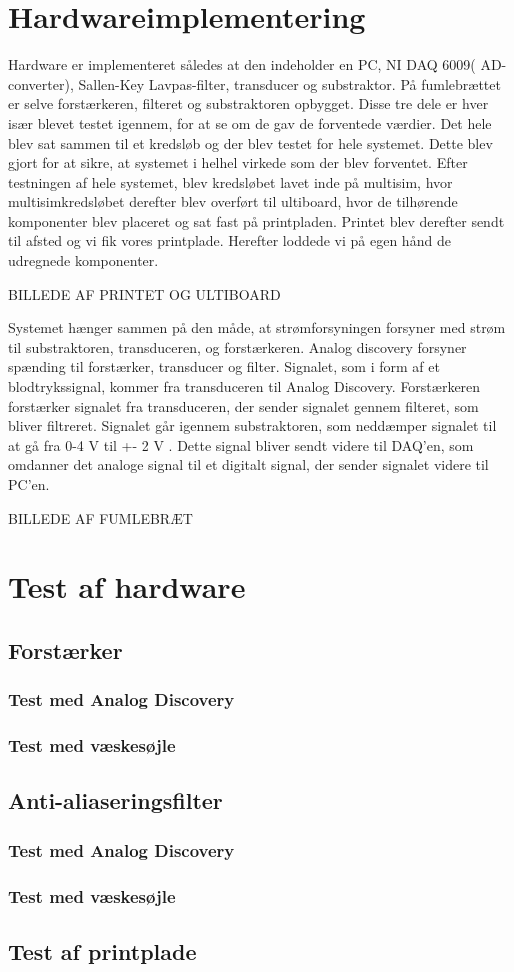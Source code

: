 \section{Hardwareimplementering}
Hardware er implementeret således at den indeholder en PC, NI DAQ 6009( AD-converter), Sallen-Key Lavpas-filter, transducer og substraktor. På fumlebrættet er selve forstærkeren, filteret og substraktoren opbygget. Disse tre dele er hver især blevet testet igennem, for at se om de gav de forventede værdier. Det hele blev sat sammen til et kredsløb og der blev testet for hele systemet. Dette blev gjort for at sikre, at systemet i helhel virkede som der blev forventet. Efter testningen af hele systemet, blev kredsløbet lavet inde på multisim, hvor multisimkredsløbet derefter blev overført til ultiboard, hvor de tilhørende komponenter blev placeret og sat fast på printpladen.  Printet blev derefter sendt til afsted og vi fik vores printplade. Herefter loddede vi på egen hånd de udregnede komponenter. 

BILLEDE AF PRINTET OG ULTIBOARD

Systemet hænger sammen på den måde, at strømforsyningen forsyner med strøm til substraktoren, transduceren,  og forstærkeren. Analog discovery forsyner spænding til forstærker, transducer og filter.
Signalet, som i form af et blodtrykssignal, kommer fra transduceren til Analog Discovery.  Forstærkeren forstærker signalet fra transduceren, der sender signalet gennem filteret, som bliver filtreret. Signalet går igennem substraktoren, som neddæmper signalet til at gå fra 0-4 V til +- 2 V . Dette signal bliver sendt videre til DAQ’en, som omdanner det analoge signal til et digitalt signal, der sender signalet videre til PC’en. 

BILLEDE AF FUMLEBRÆT


\section{Test af hardware}
\subsection{Forstærker}

\subsubsection{Test med Analog Discovery}
\subsubsection{Test med væskesøjle}
\subsection{Anti-aliaseringsfilter}
\subsubsection{Test med Analog Discovery}
\subsubsection{Test med væskesøjle}
\subsection{Test af printplade}

